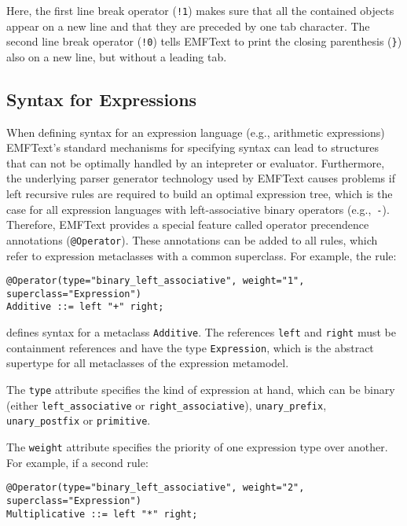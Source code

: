 Here, the first line break operator (\texttt{!1}) makes sure that all the
contained objects appear on a new line and that they are preceded by one tab
character. The second line break operator (\texttt{!0}) tells EMFText to print
the closing parenthesis (\texttt{\}}) also on a new line, but without a leading
tab.

\subsection{Syntax for Expressions}
When defining syntax for an expression language (e.g., arithmetic expressions) 
EMFText's standard mechanisms for specifying syntax can lead to structures that 
can not be optimally handled by an intepreter or evaluator. Furthermore, the 
underlying parser generator technology used by EMFText causes problems if 
left recursive rules are required to build an optimal expression tree, which is 
the case for all expression languages with left-associative binary operators 
(e.g.,~\texttt{-}). Therefore, EMFText provides a special feature called
operator precendence annotations (\texttt{@Operator}). These annotations can be added to 
all rules, which refer to expression metaclasses with a common superclass. 
For example, the rule:

\lstset{language=CS}
\begin{lstlisting}
@Operator(type="binary_left_associative", weight="1", superclass="Expression")
Additive ::= left "+" right;
\end{lstlisting}

defines syntax for a metaclass \texttt{Additive}. The references
\texttt{left} and \texttt{right} must be containment references and have the type
\texttt{Expression}, which is the abstract supertype for all metaclasses of the 
expression metamodel.

The \texttt{type} attribute specifies the kind of expression at hand, which can
be binary (either \texttt{left\_associative} or \texttt{right\_associative}),
\texttt{unary\_prefix}, \texttt{unary\_postfix} or \texttt{primitive}.

The \texttt{weight} attribute specifies the priority of one expression type over
another. For example, if a second rule:

\lstset{language=CS}
\begin{lstlisting}
@Operator(type="binary_left_associative", weight="2", superclass="Expression")
Multiplicative ::= left "*" right;
\end{lstlisting}

